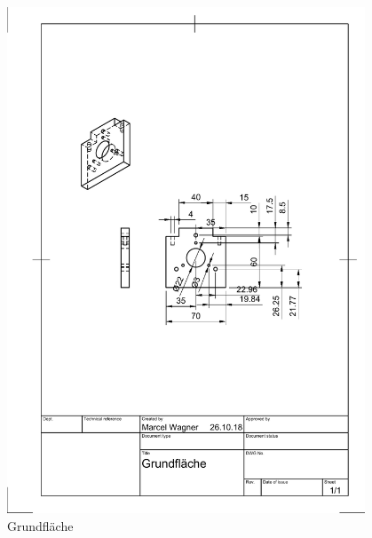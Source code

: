 \newpage
{}
\begin{figure}[H]
	\centering
	\includegraphics[width=0.95\textwidth]{images/Mechanik/Grundflaeche}
	\caption{Grundfläche}
\end{figure}
